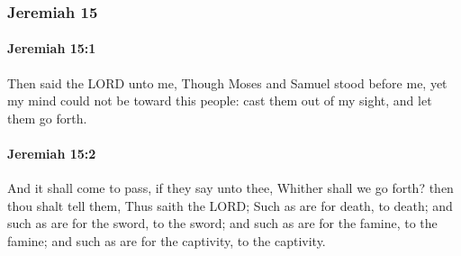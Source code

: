 	\subsubsection{Jeremiah 15} %
		\label{JEREMIAH-15}

		\paragraph{Jeremiah 15:1} %
			\label{JEREMIAH-15-1}

			Then said the LORD unto me, Though Moses and Samuel stood before me, yet my mind could not be toward this people: cast them out of my sight, and let them go forth.


		\paragraph{Jeremiah 15:2} %
			\label{JEREMIAH-15-2}

			And it shall come to pass, if they say unto thee, Whither shall we go forth? then thou shalt tell them, Thus saith the LORD; Such as are for death, to death; and such as are for the sword, to the sword; and such as are for the famine, to the famine; and such as are for the captivity, to the captivity.

